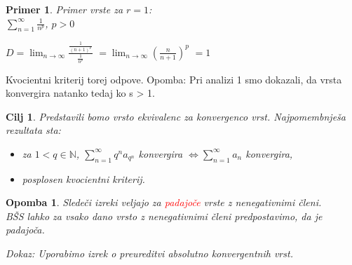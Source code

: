 \documentclass{beamer}
\newtheorem{cilj}{Cilj}
\newtheorem{opomba}{Opomba}
\newtheorem{primer}{Primer}
\begin{document}
\begin{frame}
    \begin{primer}{Primer vrste za $r = 1$}: \\
       $\sum_{n = 1}^{\infty}{\frac{1}{n^p}}$, $p > 0$
    \end{primer}
    
    \vspace{\baselineskip}
    \pause
    $D = \lim_{n \to \infty} \frac{\frac{1}{(n+1)^p}}{\frac{1}{n^p}}$
    \pause
    $= \lim_{n \to \infty} (\frac{n}{n + 1})^p$ 
    \pause
    $= 1$
    \pause
    
    \vspace{\baselineskip}
    Kvocientni kriterij torej odpove.
    Opomba: Pri analizi 1 smo dokazali, da vrsta konvergira natanko tedaj ko s > 1.
\end{frame}
\begin{frame}
    \begin{cilj}
        Predstavili bomo vrsto ekvivalenc za konvergenco vrst. Najpomembnješa rezultata sta:
        \begin{itemize}
            \item za $ 1 < q \in {\mathbb{N}}$, $\sum_{n = 1}^{\infty}{q^na_{q^n}}$ konvergira $\iff \sum_{n = 1}^{\infty}{a_{n}}$ konvergira, \\
            \item posplosen kvocientni kriterij.
        \end{itemize} 
    \end{cilj}

    \pause
    \vspace{\baselineskip}

    
    \begin{opomba}
        Sledeči izreki veljajo za \textcolor{red}{padajoče} vrste z nenegativnimi členi.\\
        BŠS lahko za vsako dano vrsto z nenegativnimi členi predpostavimo, da je padajoča.

        \vspace{\baselineskip}
        Dokaz: Uporabimo izrek o preureditvi absolutno konvergentnih vrst.
    \end{opomba}
\end{frame}
\end{document}
